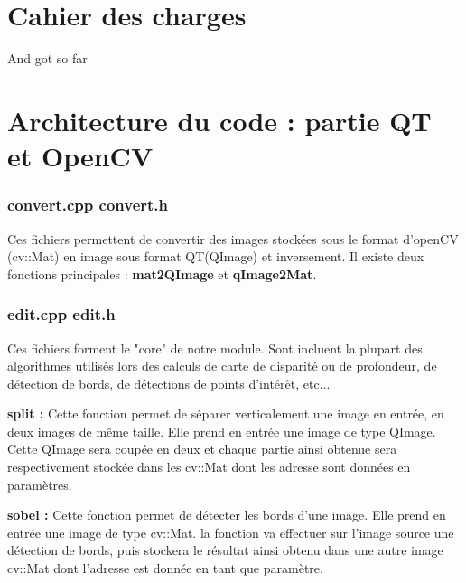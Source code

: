 \documentclass[a4paper]{article}
\begin{document}

\section{Cahier des charges}

And got so far


\section{Architecture du code : partie QT et OpenCV}

\subsubsection*{convert.cpp convert.h}

Ces fichiers permettent de convertir des images stockées sous le format d'openCV
(cv::Mat) en image sous format QT(QImage) et inversement. Il existe deux fonctions
principales : \textbf{mat2QImage} et \textbf{qImage2Mat}.

\subsubsection*{edit.cpp edit.h}

Ces fichiers forment le "core" de notre module. Sont incluent la plupart des
algorithmes utilisés lors des calculs de carte de disparité ou de profondeur,
de détection de bords, de détections de points d'intérêt, etc...


\textbf{split :} Cette fonction permet de séparer verticalement une image en
entrée, en deux images de même taille. Elle prend en entrée une image de type
QImage. Cette QImage sera coupée en deux et chaque partie ainsi obtenue sera
respectivement stockée dans les cv::Mat dont les adresse sont données en paramètres.


\textbf{sobel :} Cette fonction permet de détecter les bords d'une image. Elle
prend en entrée une image de type cv::Mat. la fonction va effectuer sur l'image
source une détection de bords, puis stockera le résultat ainsi obtenu dans une
autre image cv::Mat dont l'adresse est donnée en tant que paramètre.
\end{document}
